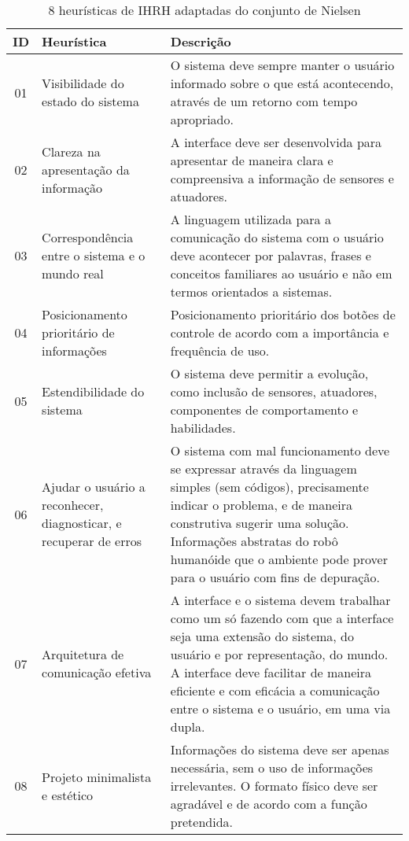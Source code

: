 \begin{table}[!ht]
	\caption{8 heurísticas de IHRH adaptadas do conjunto de Nielsen}
	\label{tab:heuristicasfutebol}
	\centering
	\begin{tabular}{ c | m{4cm} | m{10cm} }
		\hline
		ID & Heurística & Descrição \\
		\hline
        01 & Visibilidade do estado do sistema & O sistema deve sempre manter o usuário informado sobre o que está acontecendo, através de um retorno com tempo apropriado. \\
		\hline
        02 & Clareza na apresentação da informação & A interface deve ser desenvolvida para apresentar de maneira clara e compreensiva a informação de sensores e atuadores. \\
		\hline
        03 & Correspondência entre o sistema e o mundo real & A linguagem utilizada para a comunicação do sistema com o usuário deve acontecer por palavras, frases e conceitos familiares ao usuário e não em termos orientados a sistemas. \\
		\hline
        04 & Posicionamento prioritário de informações & Posicionamento prioritário dos botões de controle de acordo com a importância e frequência de uso. \\
		\hline
        05 & Estendibilidade do sistema & O sistema deve permitir a evolução, como inclusão de sensores, atuadores, componentes de comportamento e habilidades. \\
		\hline
        06 & Ajudar o usuário a reconhecer, diagnosticar, e recuperar de erros & O sistema com mal funcionamento deve se expressar através da linguagem simples (sem códigos), precisamente indicar o problema, e de maneira construtiva sugerir uma solução. Informações abstratas do robô humanóide que o ambiente pode prover para o usuário com fins de depuração. \\
		\hline
        07 & Arquitetura de comunicação efetiva & A interface e o sistema devem trabalhar como um só fazendo com que a interface seja uma extensão do sistema, do usuário e por representação, do mundo. A interface deve facilitar de maneira eficiente e com eficácia a comunicação entre o sistema e o usuário, em uma via dupla. \\
		\hline
        08 & Projeto minimalista e estético & Informações do sistema deve ser apenas necessária, sem o uso de informações irrelevantes. O formato físico deve ser agradável e de acordo com a função pretendida. \\
		\hline
	\end{tabular}
\end{table}

